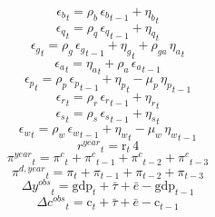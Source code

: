 \begin{dmath}
{{\epsilon_{b}}}_{t}={{\rho_{b}}}\, {{\epsilon_{b}}}_{t-1}+{{\eta_{b}}}_{t}
\end{dmath}
\begin{dmath}
{{\epsilon_{q}}}_{t}={{\rho_{q}}}\, {{\epsilon_{q}}}_{t-1}+{{\eta_{q}}}_{t}
\end{dmath}
\begin{dmath}
{{\epsilon_{g}}}_{t}={{\rho_{g}}}\, {{\epsilon_{g}}}_{t-1}+{{\eta_{g}}}_{t}+{{\rho_{ga}}}\, {{\eta_{a}}}_{t}
\end{dmath}
\begin{dmath}
{{\epsilon_{a}}}_{t}={{\eta_{a}}}_{t}+{{\rho_{a}}}\, {{\epsilon_{a}}}_{t-1}
\end{dmath}
\begin{dmath}
{{\epsilon_{p}}}_{t}={{\rho_{p}}}\, {{\epsilon_{p}}}_{t-1}+{{\eta_{p}}}_{t}-{{\mu_{p}}}\, {{\eta_{p}}}_{t-1}
\end{dmath}
\begin{dmath}
{{\epsilon_{r}}}_{t}={{\rho_{r}}}\, {{\epsilon_{r}}}_{t-1}+{{\eta_{r}}}_{t}
\end{dmath}
\begin{dmath}
{{\epsilon_{s}}}_{t}={{\rho_{s}}}\, {{\epsilon_{s}}}_{t-1}+{{\eta_{s}}}_{t}
\end{dmath}
\begin{dmath}
{{\epsilon_{w}}}_{t}={{\rho_{w}}}\, {{\epsilon_{w}}}_{t-1}+{{\eta_{w}}}_{t}-{{\mu_{w}}}\, {{\eta_{w}}}_{t-1}
\end{dmath}
\begin{dmath}
{{r^{year}}}_{t}={{\mathrm{r}}}_{t}\, 4
\end{dmath}
\begin{dmath}
{{\pi^{year}}}_{t}={{\pi^{c}}}_{t}+{{\pi^{c}}}_{t-1}+{{\pi^{c}}}_{t-2}+{{\pi^{c}}}_{t-3}
\end{dmath}
\begin{dmath}
{{\pi^{d,year}}}_{t}={{\pi}}_{t}+{{\pi}}_{t-1}+{{\pi}}_{t-2}+{{\pi}}_{t-3}
\end{dmath}
\begin{dmath}
{{\Delta y^{obs}}}_{t}={{\mathrm{gdp}}}_{t}+{{\bar{\tau}}}+{{\bar{e}}}-{{\mathrm{gdp}}}_{t-1}
\end{dmath}
\begin{dmath}
{{\Delta c^{obs}}}_{t}={{\mathrm{c}}}_{t}+{{\bar{\tau}}}+{{\bar{e}}}-{{\mathrm{c}}}_{t-1}
\end{dmath}
